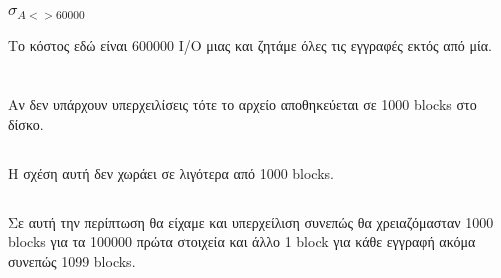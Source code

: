 \documentclass[a4paper,10pt]{article}
\begin{document}
\subsubsection{$\sigma_{A <> 60000}$}
Το κόστος εδώ είναι 600000 I/O μιας και ζητάμε όλες τις εγγραφές εκτός από
μία.
\section{}
\subsection{}
Αν δεν υπάρχουν υπερχειλίσεις τότε το αρχείο αποθηκεύεται σε 1000 blocks στο
δίσκο.
\subsection{}
Η σχέση αυτή δεν χωράει σε λιγότερα από 1000 blocks.
\subsection{}
Σε αυτή την περίπτωση θα είχαμε και υπερχείλιση συνεπώς θα χρειαζόμασταν 1000
blocks για τα 100000 πρώτα στοιχεία και άλλο 1 block για κάθε εγγραφή ακόμα
συνεπώς 1099 blocks.
\end{document}
